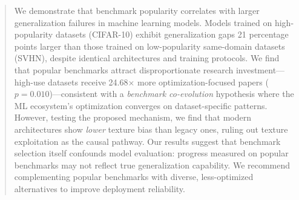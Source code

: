 \begin{abstract}
We demonstrate that benchmark popularity correlates with larger generalization failures in machine learning models. Models trained on high-popularity datasets (CIFAR-10) exhibit generalization gaps 21 percentage points larger than those trained on low-popularity same-domain datasets (SVHN), despite identical architectures and training protocols. We find that popular benchmarks attract disproportionate research investment---high-use datasets receive 24.68$\times$ more optimization-focused papers ($p=0.010$)---consistent with a \emph{benchmark co-evolution} hypothesis where the ML ecosystem's optimization converges on dataset-specific patterns. However, testing the proposed mechanism, we find that modern architectures show \emph{lower} texture bias than legacy ones, ruling out texture exploitation as the causal pathway. Our results suggest that benchmark selection itself confounds model evaluation: progress measured on popular benchmarks may not reflect true generalization capability. We recommend complementing popular benchmarks with diverse, less-optimized alternatives to improve deployment reliability.
\end{abstract}
